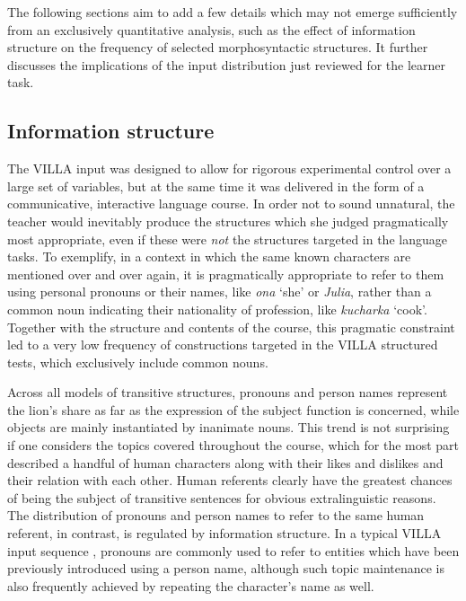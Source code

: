 The following sections aim to add a few details which may not emerge sufficiently from an exclusively quantitative analysis, such as the effect of information structure on the frequency of selected morphosyntactic structures. It further discusses the implications of the input distribution just reviewed for the learner task.

\subsection{Information structure}\label{sec:08:1.1}

The VILLA input was designed to allow for rigorous experimental control over a large set of variables, but at the same time it was delivered in the form of a communicative, interactive language course. In order not to sound unnatural, the teacher would inevitably produce the structures which she judged pragmatically most appropriate, even if these were \textit{not} the structures targeted in the language tasks. To exemplify, in a context in which the same known characters are mentioned over and over again, it is pragmatically appropriate to refer to them using personal pronouns or their names, like \textit{ona} ‘she’ or \textit{Julia}, rather than a common noun indicating their nationality of profession, like \textit{kucharka} ‘cook’. Together with the structure and contents of the course, this pragmatic constraint led to a very low frequency of constructions targeted in the VILLA structured tests, which exclusively include common nouns.

Across all models of transitive structures, pronouns and person names represent the lion's share as far as the expression of the subject function is concerned, while objects are mainly instantiated by inanimate nouns. This trend is not surprising if one considers the topics covered throughout the course, which for the most part described a handful of human characters along with their likes and dislikes and their relation with each other. Human referents clearly have the greatest chances of being the subject of transitive sentences for obvious extralinguistic reasons. The distribution of pronouns and person names to refer to the same human referent, in contrast, is regulated by information structure. In a typical VILLA input sequence , pronouns are commonly used to refer to entities which have been previously introduced using a person name, although such topic maintenance is also frequently achieved by repeating the character’s name as well.

